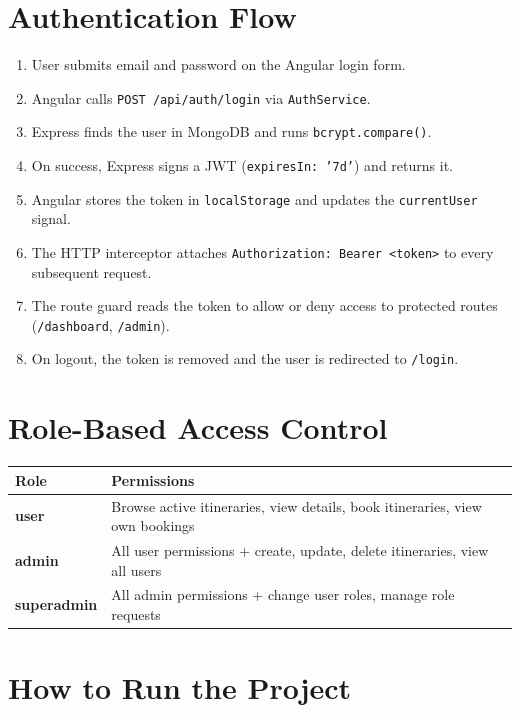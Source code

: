 \documentclass[12pt,a4paper]{article}
\begin{document}
\section{Authentication Flow}

\begin{enumerate}
    \item User submits email and password on the Angular login form.
    \item Angular calls \texttt{POST /api/auth/login} via \texttt{AuthService}.
    \item Express finds the user in MongoDB and runs \texttt{bcrypt.compare()}.
    \item On success, Express signs a JWT (\texttt{expiresIn: '7d'}) and returns it.
    \item Angular stores the token in \texttt{localStorage} and updates the \texttt{currentUser} signal.
    \item The HTTP interceptor attaches \texttt{Authorization: Bearer <token>} to every subsequent request.
    \item The route guard reads the token to allow or deny access to protected routes (\texttt{/dashboard}, \texttt{/admin}).
    \item On logout, the token is removed and the user is redirected to \texttt{/login}.
\end{enumerate}

\section{Role-Based Access Control}

\begin{longtable}{>{\bfseries}p{3cm} p{10cm}}
\toprule
Role & Permissions \\
\midrule
\endhead
user & Browse active itineraries, view details, book itineraries, view own bookings \\
admin & All user permissions + create, update, delete itineraries, view all users \\
superadmin & All admin permissions + change user roles, manage role requests \\
\bottomrule
\end{longtable}

\section{How to Run the Project}
\end{document}
